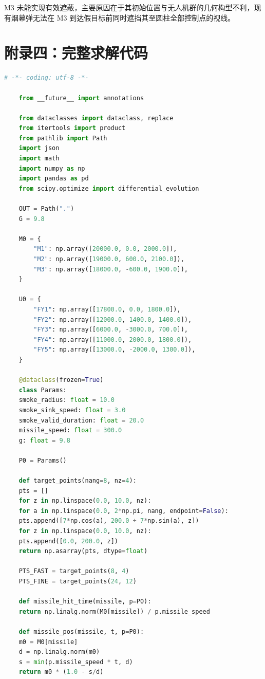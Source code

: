 \documentclass[12pt,a4paper]{article}
\begin{document}
	M3 未能实现有效遮蔽，主要原因在于其初始位置与无人机群的几何构型不利，现有烟幕弹无法在 M3 到达假目标前同时遮挡其至圆柱全部控制点的视线。
	
	
	\newpage
	\label{sec:full_code}
	
\section*{附录四：完整求解代码}

\begin{lstlisting}[language=Python, breaklines=true,breakatwhitespace=false,columns=fullflexible,basicstyle=\ttfamily\small
	烟幕干扰弹投放策略求解程序, label=code:main]
	# -*- coding: utf-8 -*-
	
	from __future__ import annotations
	
	from dataclasses import dataclass, replace
	from itertools import product
	from pathlib import Path
	import json
	import math
	import numpy as np
	import pandas as pd
	from scipy.optimize import differential_evolution
	
	OUT = Path(".")
	G = 9.8
	
	M0 = {
		"M1": np.array([20000.0, 0.0, 2000.0]),
		"M2": np.array([19000.0, 600.0, 2100.0]),
		"M3": np.array([18000.0, -600.0, 1900.0]),
	}
	
	U0 = {
		"FY1": np.array([17800.0, 0.0, 1800.0]),
		"FY2": np.array([12000.0, 1400.0, 1400.0]),
		"FY3": np.array([6000.0, -3000.0, 700.0]),
		"FY4": np.array([11000.0, 2000.0, 1800.0]),
		"FY5": np.array([13000.0, -2000.0, 1300.0]),
	}
	
	@dataclass(frozen=True)
	class Params:
	smoke_radius: float = 10.0
	smoke_sink_speed: float = 3.0
	smoke_valid_duration: float = 20.0
	missile_speed: float = 300.0
	g: float = 9.8
	
	P0 = Params()
	
	def target_points(nang=8, nz=4):
	pts = []
	for z in np.linspace(0.0, 10.0, nz):
	for a in np.linspace(0.0, 2*np.pi, nang, endpoint=False):
	pts.append([7*np.cos(a), 200.0 + 7*np.sin(a), z])
	for z in np.linspace(0.0, 10.0, nz):
	pts.append([0.0, 200.0, z])
	return np.asarray(pts, dtype=float)
	
	PTS_FAST = target_points(8, 4)
	PTS_FINE = target_points(24, 12)
	
	def missile_hit_time(missile, p=P0):
	return np.linalg.norm(M0[missile]) / p.missile_speed
	
	def missile_pos(missile, t, p=P0):
	m0 = M0[missile]
	d = np.linalg.norm(m0)
	s = min(p.missile_speed * t, d)
	return m0 * (1.0 - s/d)
	

\end{lstlisting}
\end{document}
